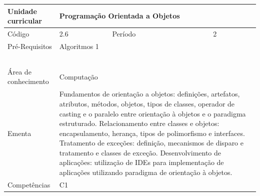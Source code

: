 \clearpage
\newpage

\begin{quadro}[ht!]
  \centering\scriptsize
\caption{Unidade Curricular Programação Orientada a Objetos}

\begin{tabular}{|p{2.5cm}|p{2.5cm}|p{2.5cm}|p{2.5cm}|p{2.5cm}|}\hline

  Unidade curricular & \multicolumn{4}{p{10cm}|}{ Programação Orientada a Objetos }\\\hline
  Código & 2.6 & Período & \multicolumn{2}{p{5cm}|}{ 2 }\\\hline
  Pré-Requisitos & \multicolumn{4}{p{10cm}|}{ Algoritmos 1 } \\\hline
  \cellcolor{blue1}{ CH PRESENCIAL } &
    \cellcolor{blue1}{CH EAD Síncrona} &
    \cellcolor{blue1}{CH EAD Síncrona Mediada} &
    \cellcolor{blue1}{CH EAD Assíncrona} &
    \cellcolor{blue1}{CH APCC} \\\hline
  \cellcolor{blue1}{ 30 } &
    \cellcolor{blue1}{ 0 } &
    \cellcolor{blue1}{ 0 } &
    \cellcolor{blue1}{ 30 } &
    \cellcolor{blue1}{0} \\\hline
  \cellcolor{blue1}{ CH Teórica } &
    \cellcolor{blue1}{CH Prática} &
    \cellcolor{blue1}{CH Humanidades} &
    \cellcolor{blue1}{CH Extensão} &
    \cellcolor{blue1}{CH EAD TOTAL} \\\hline
  \cellcolor{blue1}{ 30 } &
    \cellcolor{blue1}{ 30 } &
    \cellcolor{blue1}{ 0 } &
    \cellcolor{blue1}{ 0 } &
    \cellcolor{blue1}{ 30 } \\\hline
  \cellcolor{blue1}{CARGA-HORÁRIA TOTAL} & \multicolumn{4}{p{10cm}|}{ \cellcolor{blue1}{ 60 } } \\\hline
  Área de conhecimento & \multicolumn{4}{p{10cm}|}{ Computação } \\\hline
  Ementa & \multicolumn{4}{p{10cm}|}{ Fundamentos de orientação a objetos: definições, artefatos, atributos, métodos, objetos, tipos de classes, operador de casting e o paralelo entre orientação à objetos e o paradigma estruturado. Relacionamento entre classes e objetos: encapsulamento, herança, tipos de polimorfismo e interfaces. Tratamento de exceções: definição, mecanismos de disparo e tratamento e classes de exceção. Desenvolvimento de aplicações: utilização de IDEs para implementação de aplicações utilizando paradigma de orientação à objetos. } \\\hline
  Competências & \multicolumn{4}{p{10cm}|}{ C1 } \\\hline


  
	\end{tabular}

\end{quadro}


